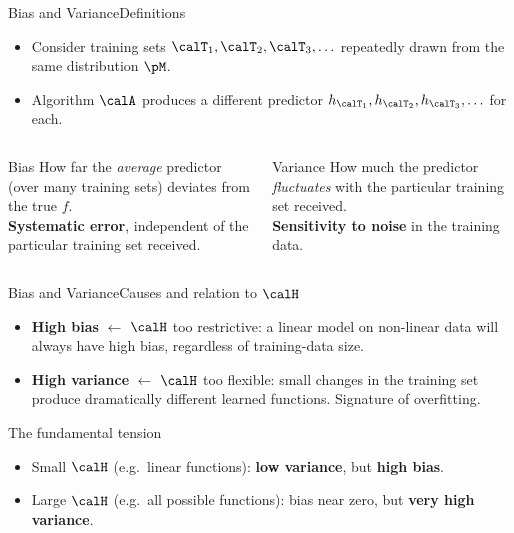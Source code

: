 \begin{frame}{Bias and Variance}{Definitions}
  \begin{itemize}
    \item Consider training sets $\calT_1, \calT_2, \calT_3, \ldots$ repeatedly drawn from
          the same distribution $\pM$.
    \item Algorithm $\calA$ produces a different predictor
          $h_{\calT_1}, h_{\calT_2}, h_{\calT_3}, \ldots$ for each.
  \end{itemize}
  \bigskip
  \begin{columns}[T]
    \begin{block}{Bias}
      How far the \emph{average} predictor (over many training sets) deviates from the true
      $f$.\\[4pt]
      \textbf{Systematic error}, independent of the particular training set received.
    \end{block}
    \begin{block}{Variance}
      How much the predictor \emph{fluctuates} with the particular training set received.\\[4pt]
      \textbf{Sensitivity to noise} in the training data.
    \end{block}
  \end{columns}
\end{frame}

\begin{frame}{Bias and Variance}{Causes and relation to $\calH$}
  \begin{itemize}
    \item \textbf{High bias} $\leftarrow$ $\calH$ too restrictive: a linear model on
          non-linear data will always have high bias, regardless of training-data size.
    \item \textbf{High variance} $\leftarrow$ $\calH$ too flexible: small changes in the
          training set produce dramatically different learned functions.
          Signature of overfitting.
  \end{itemize}
  \bigskip
  \begin{block}{The fundamental tension}
    \begin{itemize}
      \item Small $\calH$ (e.g.\ linear functions): \textbf{low variance}, but \textbf{high
            bias}.
      \item Large $\calH$ (e.g.\ all possible functions): bias near zero, but \textbf{very
            high variance}.
    \end{itemize}
  \end{block}
\end{frame}

